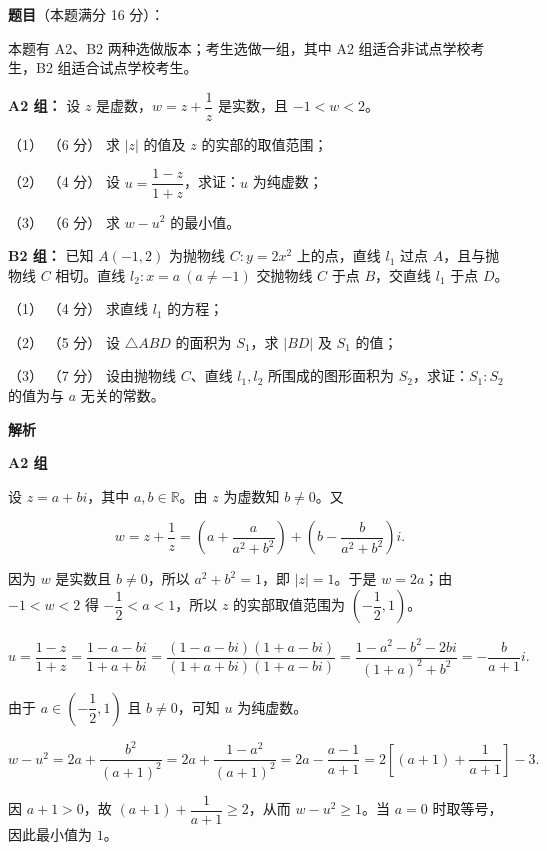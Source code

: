 \begin{answer}

\textbf{题目}（本题满分 16 分）：

本题有 A2、B2 两种选做版本；考生选做一组，其中 A2 组适合非试点学校考生，B2 组适合试点学校考生。

\textbf{A2 组：} 设 $z$ 是虚数，$w=z+\dfrac1z$ 是实数，且 $-1<w<2$。

（1） （6 分） 求 $|z|$ 的值及 $z$ 的实部的取值范围；

（2） （4 分） 设 $u=\dfrac{1-z}{1+z}$，求证：$u$ 为纯虚数；

（3） （6 分） 求 $w-u^2$ 的最小值。

\textbf{B2 组：} 已知 $A(-1,2)$ 为抛物线 $C:y=2x^2$ 上的点，直线 $l_1$ 过点 $A$，且与抛物线 $C$ 相切。直线 $l_2:x=a\ (a\ne-1)$ 交抛物线 $C$ 于点 $B$，交直线 $l_1$ 于点 $D$。

（1） （4 分） 求直线 $l_1$ 的方程；

（2） （5 分） 设 $\triangle ABD$ 的面积为 $S_1$，求 $|BD|$ 及 $S_1$ 的值；

（3） （7 分） 设由抛物线 $C$、直线 $l_1,l_2$ 所围成的图形面积为 $S_2$，求证：$S_1:S_2$ 的值为与 $a$ 无关的常数。

\textbf{解析}

\textbf{A2 组}


设 $z=a+bi$，其中 $a,b\in\mathbb R$。由 $z$ 为虚数知 $b\ne0$。又

\nopagebreak[4]
\[
w=z+\dfrac1z
=\left(a+\dfrac{a}{a^2+b^2}\right)
+\left(b-\dfrac{b}{a^2+b^2}\right)i.
\]

因为 $w$ 是实数且 $b\ne0$，所以 $a^2+b^2=1$，即 $|z|=1$。于是 $w=2a$；由 $-1<w<2$ 得 $-\dfrac12<a<1$，所以 $z$ 的实部取值范围为 $\left(-\dfrac12,1\right)$。


\nopagebreak[4]
\[
u=\dfrac{1-z}{1+z}
=\dfrac{1-a-bi}{1+a+bi}
=\dfrac{(1-a-bi)(1+a-bi)}{(1+a+bi)(1+a-bi)}
=\dfrac{1-a^2-b^2-2bi}{(1+a)^2+b^2}
=-\dfrac{b}{a+1}i.
\]

由于 $a\in\left(-\dfrac12,1\right)$ 且 $b\ne0$，可知 $u$ 为纯虚数。


\nopagebreak[4]
\[
w-u^2=2a+\dfrac{b^2}{(a+1)^2}
=2a+\dfrac{1-a^2}{(a+1)^2}
=2a-\dfrac{a-1}{a+1}
=2\left[(a+1)+\dfrac1{a+1}\right]-3.
\]

因 $a+1>0$，故 $(a+1)+\dfrac1{a+1}\ge2$，从而 $w-u^2\ge1$。当 $a=0$ 时取等号，因此最小值为 $1$。


\end{answer}
